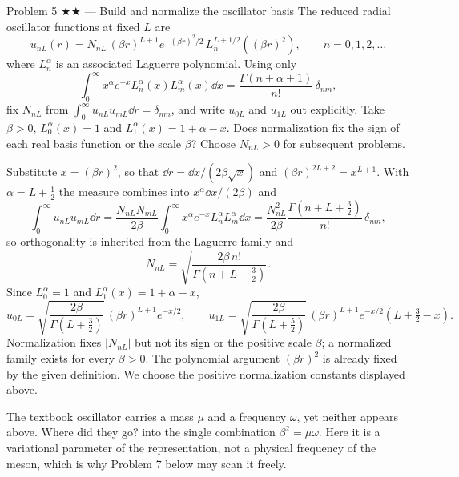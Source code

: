 \documentclass[11pt]{article}
\begin{document}
\begin{problem}{Problem 5 ★★ — Build and normalize the oscillator basis}
The reduced radial oscillator functions at fixed $L$ are
\[
u_{nL}(r)=N_{nL}\,(\beta r)^{L+1}e^{-(\beta r)^2/2}\,
L_n^{L+1/2}\!\left((\beta r)^2\right),\qquad n=0,1,2,\dots
\]
where $L_n^\alpha$ is an associated Laguerre polynomial. Using only
\[
\int_0^\infty x^\alpha e^{-x}L_n^\alpha(x)L_m^\alpha(x)\dd x
=\frac{\Gamma(n+\alpha+1)}{n!}\,\delta_{nm},
\]
fix $N_{nL}$ from $\int_0^\infty u_{nL}u_{mL}\dd r=\delta_{nm}$, and write
$u_{0L}$ and $u_{1L}$ out explicitly. Take $\beta>0$, $L_0^\alpha(x)=1$ and
$L_1^\alpha(x)=1+\alpha-x$. Does normalization fix the sign of each real
basis function or the scale $\beta$? Choose $N_{nL}>0$ for subsequent problems.
\end{problem}
\begin{solution}
Substitute $x=(\beta r)^2$, so that $\dd r=\dd x/(2\beta\sqrt x)$ and
$(\beta r)^{2L+2}=x^{L+1}$. With $\alpha=L+\tfrac12$ the measure combines into
$x^{\alpha}\dd x/(2\beta)$ and
\[
\int_0^\infty u_{nL}u_{mL}\dd r
=\frac{N_{nL}N_{mL}}{2\beta}\int_0^\infty x^{\alpha}e^{-x}
L_n^\alpha L_m^\alpha\dd x
=\frac{N_{nL}^2}{2\beta}\frac{\Gamma(n+L+\tfrac32)}{n!}\,\delta_{nm},
\]
so orthogonality is inherited from the Laguerre family and
\[
N_{nL}=\sqrt{\frac{2\beta\,n!}{\Gamma(n+L+\tfrac32)}}.
\]
Since $L_0^\alpha=1$ and $L_1^\alpha(x)=1+\alpha-x$,
\[
u_{0L}=\sqrt{\frac{2\beta}{\Gamma(L+\tfrac32)}}\,(\beta r)^{L+1}e^{-x/2},
\qquad
u_{1L}=\sqrt{\frac{2\beta}{\Gamma(L+\tfrac52)}}\,(\beta r)^{L+1}e^{-x/2}
\left(L+\tfrac32-x\right).
\]
Normalization fixes $|N_{nL}|$ but not its sign or the positive scale
$\beta$; a normalized family exists for every $\beta>0$. The polynomial
argument $(\beta r)^2$ is already fixed by the given definition. We choose
the positive normalization constants displayed above.
\end{solution}
\begin{quiz}
The textbook oscillator carries a mass $\mu$ and a frequency $\omega$, yet
neither appears above. Where did they go? \answer into the single combination
$\beta^2=\mu\omega$. Here it is a variational parameter of the representation,
not a physical frequency of the meson, which is why Problem 7 below may scan it
freely.
\end{quiz}
\end{document}
